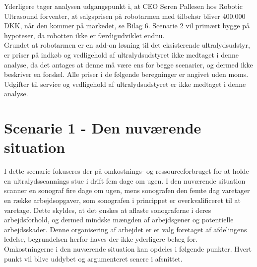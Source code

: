 Yderligere tager analysen udgangspunkt i, at CEO Søren Pallesen hos Robotic Ultrasound forventer, at salgsprisen på robotarmen med tilbehør bliver 400.000 DKK, når den kommer på markedet, se Bilag 6. Scenarie 2 vil primært bygge på hypoteser, da robotten ikke er færdigudviklet endnu. \\
Grundet at robotarmen er en add-on løsning til det eksisterende ultralydsudstyr, er priser på indkøb og vedligehold af ultralydsudstyret ikke medtaget i denne analyse, da det antages at denne må være ens for begge scenarier, og dermed ikke beskriver en forskel. Alle priser i de følgende beregninger er angivet uden moms. Udgifter til service og vedligehold af ultralydsudstyret er ikke medtaget i denne analyse. 

\section{Scenarie 1 - Den nuværende situation} \label{nuvaerende}
I dette scenarie fokuseres der på omkostnings- og ressourceforbruget for at holde en ultralydsscannings stue i drift fem dage om ugen. I den nuværende situation scanner en sonograf fire dage om ugen, mens sonografen den femte dag varetager en række arbejdsopgaver, som sonografen i princippet er overkvalificeret til at varetage. Dette skyldes, at det ønskes at aflaste sonograferne i deres arbejdsforhold, og dermed mindske mængden af arbejdsgener og potentielle arbejdsskader. Denne organisering af arbejdet er et valg foretaget af afdelingens ledelse, begrundelsen herfor haves der ikke yderligere belæg for. \\ 
Omkostningerne i den nuværende situation kan opdeles i følgende punkter. Hvert punkt vil blive uddybet og argumenteret senere i afsnittet.


